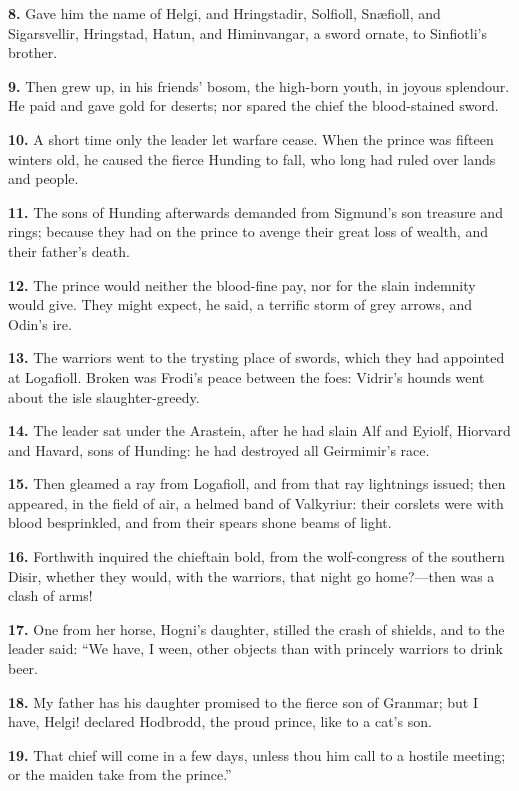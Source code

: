 \textbf{8.} Gave him the name of Helgi, and Hringstadir, Solfioll, Snæfioll,
and Sigarsvellir, Hringstad, Hatun, and Himinvangar, a sword ornate,
to Sinfiotli's brother.

\textbf{9.} Then grew up, in his friends' bosom, the high-born youth, in
joyous splendour. He paid and gave gold for deserts; nor spared the
chief the blood-stained sword.

\textbf{10.} A short time only the leader let warfare cease. When the prince
was fifteen winters old, he caused the fierce Hunding to fall, who
long had ruled over lands and people.

\textbf{11.} The sons of Hunding afterwards demanded from Sigmund's son
treasure and rings; because they had on the prince to avenge their
great loss of wealth, and their father's death.

\textbf{12.} The prince would neither the blood-fine pay, nor for the slain
indemnity would give. They might expect, he said, a terrific storm of
grey arrows, and Odin's ire.

\textbf{13.} The warriors went to the trysting place of swords, which they
had appointed at Logafioll. Broken was Frodi's peace between the foes:
Vidrir's hounds went about the isle slaughter-greedy.

\textbf{14.} The leader sat under the Arastein, after he had slain Alf and
Eyiolf, Hiorvard and Havard, sons of Hunding: he had destroyed all
Geirmimir's race.

\textbf{15.} Then gleamed a ray from Logafioll, and from that ray lightnings
issued; then appeared, in the field of air, a helmed band of
Valkyriur: their corslets were with blood besprinkled, and from their
spears shone beams of light.

\textbf{16.} Forthwith inquired the chieftain bold, from the wolf-congress of
the southern Disir, whether they would, with the warriors, that night
go home?—then was a clash of arms!

\textbf{17.} One from her horse, Hogni's daughter, stilled the crash of
shields, and to the leader said: ``We have, I ween, other objects than
with princely warriors to drink beer.

\textbf{18.} My father has his daughter promised to the fierce son of
Granmar; but I have, Helgi! declared Hodbrodd, the proud prince, like
to a cat's son.

\textbf{19.} That chief will come in a few days, unless thou him call to a
hostile meeting; or the maiden take from the prince.''

